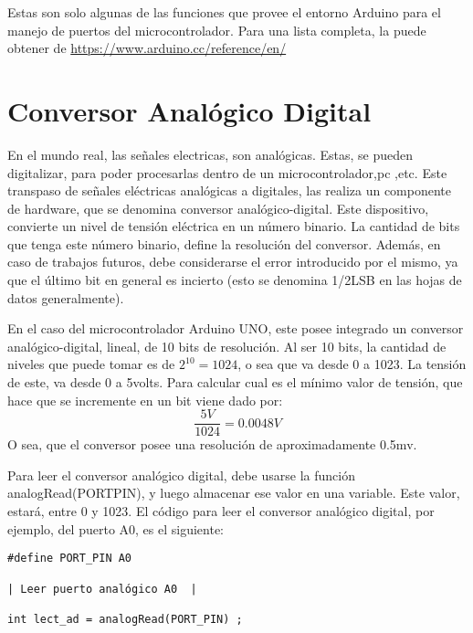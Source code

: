 Estas son solo algunas de las funciones que provee el entorno Arduino para el manejo de puertos del microcontrolador. Para una lista completa, la puede obtener de \url{https://www.arduino.cc/reference/en/}

\section{Conversor Analógico Digital}

En el mundo real, las señales electricas, son analógicas. Estas, se pueden digitalizar, para poder procesarlas dentro de un microcontrolador,pc ,etc. Este transpaso de señales eléctricas analógicas a digitales, las realiza un componente de hardware, que se denomina conversor analógico-digital. Este dispositivo, convierte un nivel de tensión eléctrica en un número binario. La cantidad de bits que tenga este número binario, define la resolución del conversor. Además, en caso de trabajos futuros, debe considerarse el error introducido por el mismo, ya que el último bit en general es incierto (esto se denomina 1/2LSB en las hojas de datos generalmente). 

En el caso del microcontrolador Arduino UNO, este posee integrado un conversor analógico-digital, lineal, de 10 bits de resolución. Al ser 10 bits, la cantidad de niveles que puede tomar es de $2^10 = 1024$, o sea que va desde 0 a 1023. La tensión de este, va desde 0 a 5volts. Para calcular cual es el mínimo valor de tensión, que hace que se incremente en un bit viene dado por: 
\[
	\frac{5V}{1024} = 0.0048V 
\] 
O sea, que el conversor posee una resolución de aproximadamente 0.5mv. 

Para leer el conversor analógico digital, debe usarse la función analogRead(PORTPIN), y luego almacenar ese valor en una variable. Este valor, estará, entre 0 y 1023. El código para leer el conversor analógico digital, por ejemplo, del puerto A0, es el siguiente: 
\begin{verbatim}
#define PORT_PIN A0 

| Leer puerto analógico A0  |

int lect_ad = analogRead(PORT_PIN) ; 


\end{verbatim} 
